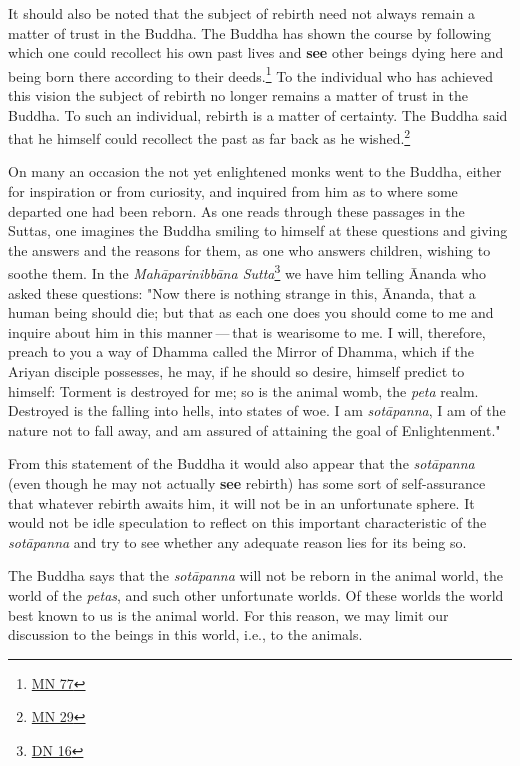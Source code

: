 It should also be noted that the subject of rebirth need not always
remain a matter of trust in the Buddha. The Buddha has shown the course
by following which one could recollect his own past lives and \textbf{see}
other beings dying here and being born there according to their
deeds.\footnote{\href{https://suttacentral.net/mn77/en/bodhi}{MN 77}} To the individual who has achieved
this vision the subject of rebirth no longer remains a matter of trust
in the Buddha. To such an individual, rebirth is a matter of certainty.
The Buddha said that he himself could recollect the past as far back as
he wished.\footnote{\href{https://suttacentral.net/mn29/en/bodhi}{MN 29}}


On many an occasion the not yet enlightened monks went to the Buddha,
either for inspiration or from curiosity, and inquired from him as to
where some departed one had been reborn. As one reads through these
passages in the Suttas, one imagines the Buddha smiling to himself
at these questions and giving the answers and the reasons for them, as
one who answers children, wishing to soothe them. In the
\emph{Mahāparinibbāna Sutta}\footnote{\href{https://suttacentral.net/dn16/en/bodhi}{DN 16}} we have him telling
Ānanda who asked these questions: "Now there is nothing strange in this,
Ānanda, that a human being should die; but that as each one does you
should come to me and inquire about him in this manner — that is
wearisome to me. I will, therefore, preach to you a way of Dhamma called
the Mirror of Dhamma, which if the Ariyan disciple possesses, he may, if
he should so desire, himself predict to himself: Torment is destroyed
for me; so is the animal womb, the \emph{peta} realm. Destroyed is the
falling into hells, into states of woe. I am \emph{sotāpanna}, I am of the
nature not to fall away, and am assured of attaining the goal of
Enlightenment."


From this statement of the Buddha it would also appear that the
\emph{sotāpanna} (even though he may not actually \textbf{see} rebirth) has some
sort of self-assurance that whatever rebirth awaits him, it will not be
in an unfortunate sphere. It would not be idle speculation to reflect on
this important characteristic of the \emph{sotāpanna} and try to see whether
any adequate reason lies for its being so.


The Buddha says that the \emph{sotāpanna} will not be reborn in the animal
world, the world of the \emph{petas}, and such other unfortunate worlds. Of
these worlds the world best known to us is the animal world. For this
reason, we may limit our discussion to the beings in this world, i.e.,
to the animals.


